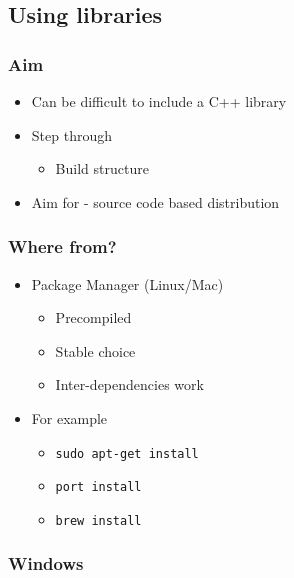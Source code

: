 \subsection{Using libraries}\label{using-libraries}

\subsubsection{Aim}\label{aim-1}

\begin{itemize}
\itemsep1pt\parskip0pt
\item
  Can be difficult to include a C++ library
\item
  Step through

  \begin{itemize}
  \itemsep1pt\parskip0pt
  \item
    Build structure
  \end{itemize}
\item
  Aim for - source code based distribution
\end{itemize}

\subsubsection{Where from?}\label{where-from}

\begin{itemize}
\itemsep1pt\parskip0pt
\item
  Package Manager (Linux/Mac)

  \begin{itemize}
  \itemsep1pt\parskip0pt
  \item
    Precompiled
  \item
    Stable choice
  \item
    Inter-dependencies work
  \end{itemize}
\item
  For example

  \begin{itemize}
  \itemsep1pt\parskip0pt
  \item
    \texttt{sudo apt-get install}
  \item
    \texttt{port install}
  \item
    \texttt{brew install}
  \end{itemize}
\end{itemize}

\subsubsection{Windows}\label{windows}

